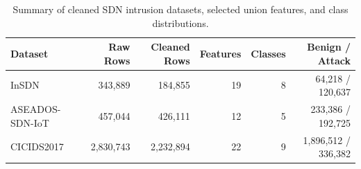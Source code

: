 \begin{table}[t]
\centering
\caption{Summary of cleaned SDN intrusion datasets, selected union features, and class distributions.}
\label{tab:datasets}
\begin{tabular}{lrrrrr}
\toprule
Dataset & Raw Rows & Cleaned Rows & Features & Classes & Benign / Attack \\
\midrule
InSDN & 343,889 & 184,855 & 19 & 8 & 64,218 / 120,637 \\
ASEADOS-SDN-IoT & 457,044 & 426,111 & 12 & 5 & 233,386 / 192,725 \\
CICIDS2017 & 2,830,743 & 2,232,894 & 22 & 9 & 1,896,512 / 336,382 \\
\bottomrule
\end{tabular}
\end{table}

